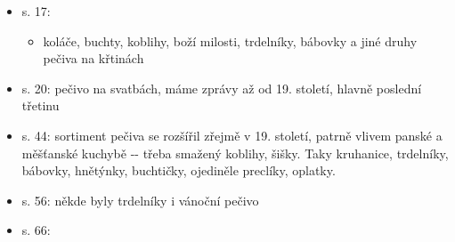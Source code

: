 \begin{itemize}
\begin{itemize}
\begin{itemize}
      \begin{itemize}
      \tightlist
      \item
        válečky těsta smíseného jako na mrváně, namotaly se na hladký
        polínka a pekly nad hromádkou dřevěnýho uhlí na kraji pece nebo
        na ohništi nad hromádkou řežavýho uhlí
      \item
        válečky se podložily vidlicema nebo hrnci a otáčely se
      \item
        musely se péct jen slabě, jinak byly tvrdý. Po upečení se sypaly
        cukrem.
      \item
        pozdějc se se pekly v troubě
      \item
        Gorlová, NSČ 11
      \end{itemize}
    \item
      odkazy na literaturu -\/- Šebestová, Lidské dokumenty;
    \item
      o druzích těsta a způsobech pečení píšou respondenti v dotazníku
      NSČ 11
    \item
      v poslední době se dělají i z lístkovýho těsta a pečou na
      plechových formičkách. Někde navinutý těsto i nakrajují jako boží
      milosti, aby se při pečení těsto nafouklo a pak popraskalo a
      vytvářelo ozdoby. Plní je cukrovým sněhem nebo šlehačkou.
      (Schwarzer, NSČ 11)
    \end{itemize}
  \item
    s. 17:

    \begin{itemize}
    \tightlist
    \item
      koláče, buchty, koblihy, boží milosti, trdelníky, bábovky a jiné
      druhy pečiva na křtinách
    \end{itemize}
  \item
    s. 20: pečivo na svatbách, máme zprávy až od 19. století, hlavně
    poslední třetinu
  \item
    s. 44: sortiment pečiva se rozšířil zřejmě v 19. století, patrně
    vlivem panské a měšťanské kuchybě -\/- třeba smažený koblihy, šišky.
    Taky kruhanice, trdelníky, bábovky, hnětýnky, buchtičky, ojediněle
    preclíky, oplatky.
  \item
    s. 56: někde byly trdelníky i vánoční pečivo
  \item
    s. 66:


\end{itemize}
\end{itemize}
